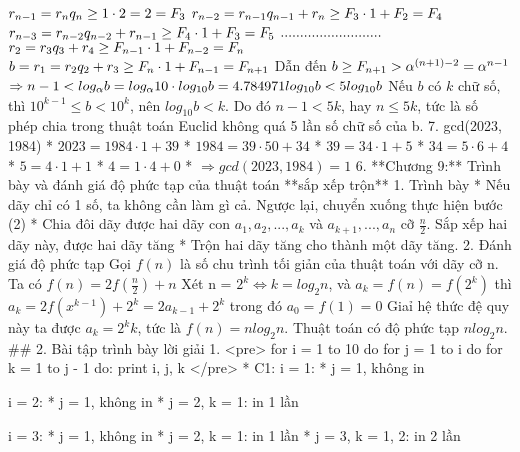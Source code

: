         $r_{n-1}=r_nq_n\geq 1\cdot2=2=F_3 \newline$
        $r_{n-2}=r_{n-1}q_{n-1}+r_n\geq F_3\cdot1+F_2 = F_4 \newline$
        $r_{n-3}=r_{n-2}q_{n-2}+r_{n-1}\geq F_4\cdot1+F_3 = F_5 \newline$
        $.......................... \newline$
        $r_2=r_3q_3+r_4\geq F_{n-1}\cdot1+F_{n-2}=F_n \newline$
        $b=r_1=r_2q_2+r_3\geq F_n\cdot1+F_{n-1}=F_{n+1} \newline$
        Dẫn đến
        $b \geq F_{n+1}>\alpha^{(n+1)-2}=\alpha^{n-1} \newline$
        $\Rightarrow n-1 < log_\alpha b = log_\alpha10\cdot log_{10}b=4.784971log_{10}b<5log_{10}b \newline$
        Nếu $b$ có $k$ chữ số, thì $10^{k-1}\leq b < 10^k$, nên $log_{10}b<k$. Do đó $n-1<5k$, hay $n\leq 5k$, tức là số phép chia trong thuật toán Euclid không quá 5 lần số chữ số của b.
    7. gcd(2023, 1984)
        *    $2023 = 1984 \cdot1 + 39$
        *    $1984 = 39 \cdot50 + 34$
        *    $39 = 34 \cdot1 + 5$
        *    $34 = 5 \cdot6 + 4$
        *    $5 = 4 \cdot1 + 1$
        *    $4 = 1\cdot4 + 0$
        *    $\Rightarrow gcd(2023, 1984) = 1$
6. **Chương 9:** Trình bày và đánh giá độ phức tạp của thuật toán **sắp xếp trộn**
    1. Trình bày
        *  Nếu dãy chỉ có 1 số, ta không cần làm gì cả. Ngược lại, chuyển xuống thực hiện bước (2)
        *  Chia đôi dãy được hai dãy con $a_1, a_2, ..., a_k$ và $a_{k+1}, ..., a_n$ cỡ $\frac{n}{2}$. Sắp xếp hai dãy này, được hai dãy tăng
        *  Trộn hai dãy tăng cho thành một dãy tăng.
    2. Đánh giá độ phức tạp
        Gọi $f(n)$ là số chu trình tối giản của thuật toán với dãy cỡ n. Ta có 
        $f(n)=2f(\frac{n}{2})+n$
        Xét n = $2^k \Leftrightarrow k = log_2n$, và $a_k=f(n)=f(2^k)$ thì
        $a_k=2f(x^{k-1})+2^k=2a_{k-1}+2^k$
        trong đó $a_0=f(1)=0$
        Giaỉ hệ thức đệ quy này ta được $a_k=2^kk$, tức là $f(n)=nlog_2n$. Thuật toán có độ phức tạp $nlog_2n$.
## 2. Bài tập trình bày lời giải
1.
<pre>
    for i = 1 to 10 do
        for j = 1 to i do
            for k = 1 to j - 1 do:
                print i, j, k
</pre>
* C1:
    i = 1:
    * j = 1, không in

    i = 2:
    * j = 1, không in
    * j = 2, k = 1: in 1 lần

    i = 3:
    * j = 1, không in
    * j = 2, k = 1: in 1 lần    
    * j = 3, k = 1, 2: in 2 lần
    
